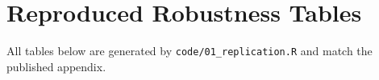 \documentclass[11pt]{article}
\newcommand{\tab}[1]{{%
  \let\origtabular\tabular \let\endorigtabular\endtabular
  \renewenvironment{tabular}{\begin{adjustbox}{max width=\textwidth}\origtabular}{\endorigtabular\end{adjustbox}}%
  }}
\begin{document}
\clearpage
\appendix
\section{Reproduced Robustness Tables}
All tables below are generated by \texttt{code/01\_replication.R} and match the published
appendix.

\tab{tab_A6_staggered_did.tex}
\tab{tab_A8_alternative_coding.tex}
\tab{tab_A9_continuous.tex}
\tab{tab_A10_drop_USA.tex}
\tab{tab_A11_nonzero.tex}
\tab{tab_A12_ihs.tex}
\tab{tab_A7_covariates.tex}
\tab{tab_A13_backsliding.tex}
\tab{tab_NR_channel.tex}



\end{document}
